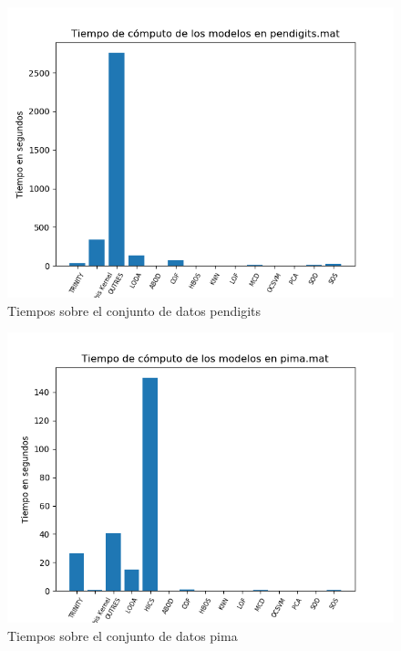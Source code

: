 \begin{figure}[H]
	\centering
	\includegraphics[scale=0.7]{imagenes/imgs-exp1/times/pendigits}
	\caption{Tiempos sobre el conjunto de datos pendigits}
	\label{pendigits_times}
\end{figure}

\begin{figure}[H]
	\centering
	\includegraphics[scale=0.7]{imagenes/imgs-exp1/times/pima}
	\caption{Tiempos sobre el conjunto de datos pima}
	\label{pima_times}
\end{figure}

